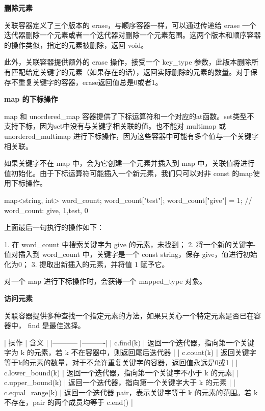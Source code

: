 \begin{enumerate}
\subitem \textbf{删除元素}

关联容器定义了三个版本的 erase，与顺序容器一样，可以通过传递给 erase 一个迭代器删除一个元素或者一个迭代器对删除一个元素范围。这两个版本和顺序容器的操作类似，指定的元素被删除，返回 void。

此外，关联容器提供额外的 erase 操作，接受一个 key_type 参数，此版本删除所有匹配给定关键字的元素（如果存在的话），返回实际删除的元素的数量。对于保存不重复关键字的容器，erase返回值总是0或者1。

\subitem \textbf{map 的下标操作}

map 和 unordered_map 容器提供了下标运算符和一个对应的at函数。set类型不支持下标，因为set中没有与关键字相关联的值。也不能对 multimap 或 unordered_multimap 进行下标操作，因为这些容器中可能有多个值与一个关键字相关联。

如果关键字不在 map 中，会为它创建一个元素并插入到 map 中，关联值将进行值初始化。由于下标运算符可能插入一个新元素，我们只可以对非 const 的map使用下标操作。
\begin{Code}
map<string, int> word_count;
word_count["test"];
word_count["give"] = 1;
// word_count: {{give, 1},{test, 0}}
\end{Code}
上面最后一句执行的操作如下：

1. 在 word_count 中搜索关键字为 give 的元素，未找到；
2. 将一个新的关键字-值对插入到 word_count 中，关键字是一个 const string，保存 give，值进行初始化为0；
3. 提取出新插入的元素，并将值 1 赋予它。

对一个 map 进行下标操作时，会获得一个 mapped_type 对象。

\subitem \textbf{ 访问元素}

关联容器提供多种查找一个指定元素的方法，如果只关心一个特定元素是否已在容器中， find 是最佳选择。

|    操作     |   含义   |
|----------- |----------|
|  c.find(k) | 返回一个迭代器，指向第一个关键字为 k 的元素，若 k 不在容器中，则返回尾后迭代器 |
| c.count(k) | 返回关键字等于k的元素的数量，对于不允许重复关键字的容器，返回值永远是0或1    |
| c.lower_bound(k) | 返回一个迭代器，指向第一个关键字不小于 k 的元素| 
| c.upper_bound(k) | 返回一个迭代器，指向第一个关键字大于 k 的元素 |
| c.equal_range(k) | 返回一个迭代器 pair，表示关键字等于 k 的元素的范围。若 k 不存在，pair 的两个成员均等于 c.end() |


\end{enumerate}
